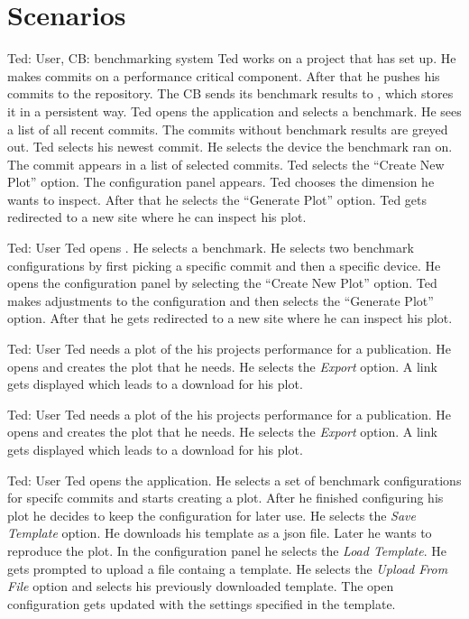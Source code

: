 \section{Scenarios}

{Ted: User, CB: \Gls{benchmarking system}}
{Ted works on a project that has \parkview{} set up. He makes commits on a performance critical component. After that he pushes his commits to the repository. The CB sends its \glspl{benchmark result} to \parkview{}, which stores it in a persistent way. Ted opens the application and selects a \gls{benchmark}. He sees a list of all recent commits. The commits without \glspl{benchmark result} are greyed out. Ted selects his newest commit. He selects the device the \gls{benchmark} ran on. The commit appears in a list of selected commits. Ted selects the \enquote{Create New Plot} option. The configuration panel appears. Ted chooses the dimension he wants to inspect. After that he selects the \enquote{Generate Plot} option. Ted gets redirected to a new site where he can inspect his \gls{plot}.} 

{Ted: User}
{Ted opens \parkview{}. He selects a \gls{benchmark}. He selects two \glspl{benchmark configuration} by first picking a specific commit and then a specific device. He opens the configuration panel by selecting the \enquote{Create New Plot} option. Ted makes adjustments to the \gls{configuration} and then selects the \enquote{Generate Plot} option. After that he gets redirected to a new site where he can inspect his \gls{plot}.}

{Ted: User}
{Ted needs a \gls{plot} of the his projects performance for a publication. He opens \parkview{} and creates the \gls{plot} that he needs. He selects the \emph{Export} option. A link gets displayed which leads to a download for his \gls{plot}.}

{Ted: User}
{Ted needs a \gls{plot} of the his projects performance for a publication. He opens \parkview{} and creates the \gls{plot} that he needs. He selects the \emph{Export} option. A link gets displayed which leads to a download for his \gls{plot}.}

{Ted: User}
{Ted opens the application. He selects a set of \glspl{benchmark configuration} for specifc commits and starts creating a \gls{plot}. After he finished configuring his \gls{plot} he decides to keep the \gls{configuration} for later use. He selects the \emph{Save Template} option. He downloads his template as a \gls{json} file. Later he wants to reproduce the \gls{plot}. In the configuration panel he selects the \emph{Load Template}. He gets prompted to upload a file containg a \gls{template}. He selects the \emph{Upload From File} option and selects his previously downloaded \gls{template}. The open \gls{configuration} gets updated with the settings specified in the \gls{template}.}

